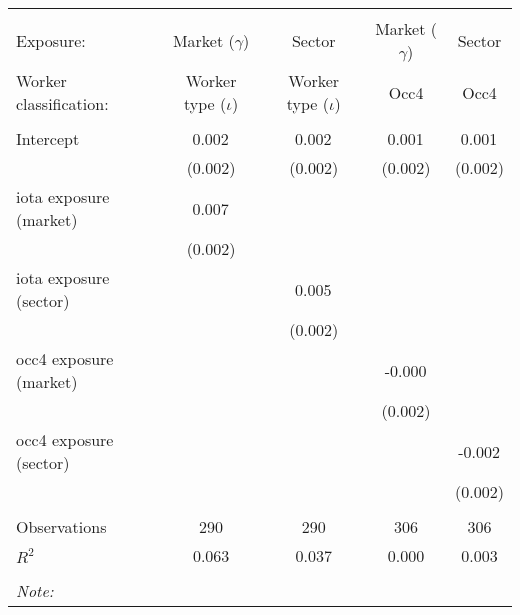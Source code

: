 \begin{tabular}{@{\extracolsep{5pt}}lcccc}
\\[-1.8ex]\hline
\hline \\[-1.8ex]
\hline \\[-1.8ex]
 Exposure: & Market ($\gamma$) & Sector & Market ($\gamma$) & Sector \\
 Worker classification: & Worker type ($\iota$) & Worker type ($\iota$) & Occ4 & Occ4 \\
 \hline &  &  &  &  \\
 Intercept & 0.002$^{}$ & 0.002$^{}$ & 0.001$^{}$ & 0.001$^{}$ \\
  & (0.002) & (0.002) & (0.002) & (0.002) \\
 iota exposure (market) & 0.007$^{}$ & & & \\
  & (0.002) & & & \\
 iota exposure (sector) & & 0.005$^{}$ & & \\
  & & (0.002) & & \\
 occ4 exposure (market) & & & -0.000$^{}$ & \\
  & & & (0.002) & \\
 occ4 exposure (sector) & & & & -0.002$^{}$ \\
  & & & & (0.002) \\
\hline \\[-1.8ex]
 Observations & 290 & 290 & 306 & 306 \\
 $R^2$ & 0.063 & 0.037 & 0.000 & 0.003 \\
\hline
\hline \\[-1.8ex]
\textit{Note:}\end{tabular}
